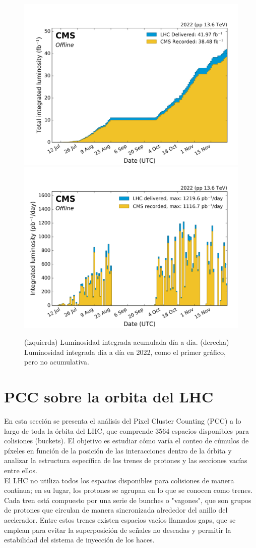 \begin{center}
  \begin{figure}[h!]
    \centering
    \includegraphics[width=.45\textwidth]{Chapter3/lumi_per_day_cumulative_pp_2022.png}
    \includegraphics[width=.45\textwidth]{Chapter3/lumi_per_day_pp_2022.png}
    \caption[Luminosidad integrada acumulada día a día en 2022]{(izquierda) Luminosidad integrada acumulada día a día. (derecha) Luminosidad integrada día a día en 2022, como el primer gráfico, pero no acumulativa.} 
    \label{Lumi_2022}
  \end{figure}
\end{center}


\section{PCC sobre la orbita del LHC}

En esta sección se presenta el análisis del Pixel Cluster Counting (PCC) a lo largo de toda la órbita del LHC, que comprende 3564 espacios disponibles para colisiones (buckets). El objetivo es estudiar cómo varía el conteo de cúmulos de píxeles en función de la posición de las interacciones dentro de la órbita y analizar la estructura específica de los trenes de protones y las secciones vacías entre ellos.\\

El LHC no utiliza todos los espacios disponibles para colisiones de manera continua; en su lugar, los protones se agrupan en lo que se conocen como trenes. Cada tren está compuesto por una serie de bunches o "vagones", que son grupos de protones que circulan de manera sincronizada alrededor del anillo del acelerador. Entre estos trenes existen espacios vacíos llamados gaps, que se emplean para evitar la superposición de señales no deseadas y permitir la estabilidad del sistema de inyección de los haces.\\

